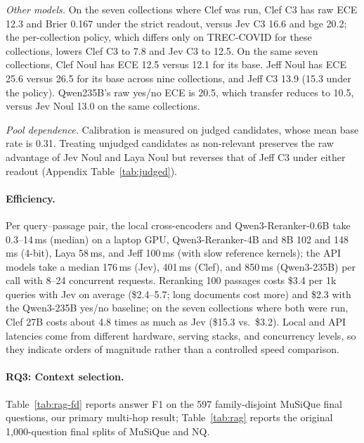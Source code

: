 \emph{Other models.} On the seven collections where Clef was run, Clef C3 has raw ECE 12.3 and Brier 0.167 under the strict readout, versus Jev C3 16.6 and bge 20.2; the per-collection policy, which differs only on TREC-COVID for these collections, lowers Clef C3 to 7.8 and Jev C3 to 12.5. On the same seven collections, Clef Noul has ECE 12.5 versus 12.1 for its base. Jeff Noul has ECE 25.6 versus 26.5 for its base across nine collections, and Jeff C3 13.9 (15.3 under the policy). Qwen235B's raw yes/no ECE is 20.5, which transfer reduces to 10.5, versus Jev Noul 13.0 on the same collections.

\emph{Pool dependence.} Calibration is measured on judged candidates, whose mean base rate is 0.31. Treating unjudged candidates as non-relevant preserves the raw advantage of Jev Noul and Laya Noul but reverses that of Jeff C3 under either readout (Appendix Table~\ref{tab:judged}).

\paragraph{Efficiency.}
Per query--passage pair, the local cross-encoders and Qwen3-Reranker-0.6B take 0.3--14\,ms (median) on a laptop GPU, Qwen3-Reranker-4B and 8B 102 and 148\,ms (4-bit), Laya 58\,ms, and Jeff 100\,ms (with slow reference kernels); the API models take a median 176\,ms (Jev), 401\,ms (Clef), and 850\,ms (Qwen3-235B) per call with 8--24 concurrent requests. Reranking 100 passages costs \$3.4 per 1k queries with Jev on average (\$2.4--5.7; long documents cost more) and \$2.3 with the Qwen3-235B yes/no baseline; on the seven collections where both were run, Clef 27B costs about 4.8 times as much as Jev (\$15.3 vs.\ \$3.2). Local and API latencies come from different hardware, serving stacks, and concurrency levels, so they indicate orders of magnitude rather than a controlled speed comparison.





\paragraph{RQ3: Context selection.}
Table~\ref{tab:rag-fd} reports answer F1 on the 597 family-disjoint MuSiQue final questions, our primary multi-hop result; Table~\ref{tab:rag} reports the original 1{,}000-question final splits of MuSiQue and NQ.

